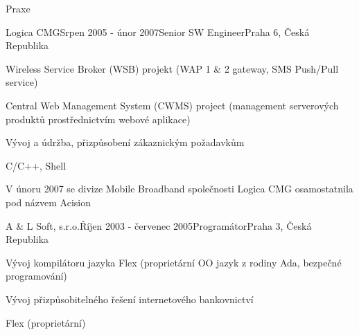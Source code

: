 \documentclass{resume} %
\begin{document}
\begin{rSection}{Praxe}
\begin{rSubsection}{Logica CMG}{Srpen 2005 - \'{u}nor 2007}{Senior SW Engineer}{Praha 6, \v{C}esk\'{a} Republika}
\item Wireless Service Broker (WSB) projekt (WAP 1 \& 2 gateway, SMS Push/Pull service)
\item Central Web Management System (CWMS) project (management serverov\'{y}ch produkt\r{u} prost\v{r}ednictv\'{i}m webov\'{e} aplikace)
\item V\'{y}voj a \'{u}dr\v{z}ba, p\v{r}izp\r{u}soben\'{i} z\'{a}kaznick\'{y}m po\v{z}adavk\r{u}m
\item C/C++, Shell
\item V \'{u}noru 2007 se divize Mobile Broadband spole\v{c}nosti Logica CMG osamostatnila pod n\'{a}zvem Acision
\end{rSubsection}


\begin{rSubsection}{A \& L Soft, s.r.o.}{\v{R}\'{i}jen 2003 - \v{c}ervenec 2005}{Program\'{a}tor}{Praha 3, \v{C}esk\'{a} Republika}
\item V\'{y}voj kompil\'{a}toru jazyka Flex (propriet\'{a}rn\'{i} OO jazyk z rodiny Ada, bezpe\v{c}n\'{e} programov\'{a}n\'{i})
\item V\'{y}voj p\v{r}izp\r{u}sobiteln\'{e}ho \v{r}e\v{s}en\'{i} internetov\'{e}ho bankovnictv\'{i}
\item Flex (propriet\'{a}rn\'{i})
\end{rSubsection}

\end{rSection}

\end{document}
